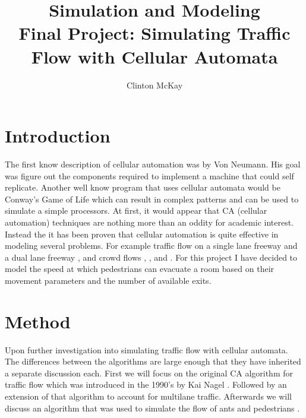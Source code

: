 \documentclass{article}%
\begin{document}
    \title{Simulation and Modeling\\Final Project: Simulating Traffic Flow with Cellular Automata}
    \author{Clinton McKay}
    \maketitle

    \twocolumn

    \section{Introduction}
    The first know description of cellular automation was by Von Neumann. 
    His goal was figure out the components required to implement a machine that could self replicate.  
    Another well know program that uses cellular automata would be Conway's Game of Life which can result in complex patterns and can be used to simulate a simple processors. 
    At first, it would appear that CA (cellular automation) techniques are nothing more than an oddity for academic interest. Instead the it has been proven that cellular automation is quite effective in modeling several problems. For example traffic flow on a single lane freeway \cite{nagel:freeway}  and a dual lane freeway \cite{rickert:twolane}, and crowd flows \cite{zhen:crowd-evac}, \cite{zhao:crowd-evac}, and \cite{kats:crowd-flow}. 
    For this project I have decided to model the speed at which pedestrians can evacuate a room based on their movement parameters and the number of available exits. 

    \section{Method}
    Upon further investigation into simulating traffic flow with cellular automata. The differences between the algorithms are large enough that they have inherited a separate discussion each. First we will focus on the original CA algorithm for traffic flow which was introduced in the 1990's by Kai Nagel \cite{nagel:freeway}. Followed by an extension of that algorithm to account for multilane traffic. Afterwards we will discuss an algorithm that was used to simulate the flow of ants and pedestrians \cite{kats:crowd-flow}. 
\end{document}
